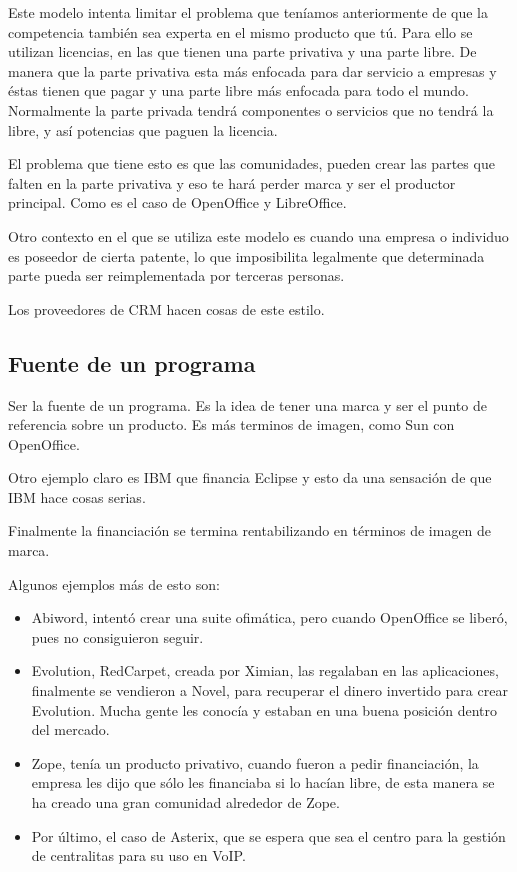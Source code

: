 Este modelo intenta limitar el problema que teníamos anteriormente de que la
competencia también sea experta en el mismo producto que tú. Para ello se
utilizan licencias, en las que tienen una parte privativa y una parte libre. De
manera que la parte privativa esta más enfocada para dar servicio a empresas y
éstas tienen que pagar y una parte libre más enfocada para todo el mundo.
Normalmente la parte privada tendrá componentes o servicios que no tendrá la
libre, y así potencias que paguen la licencia.

El problema que tiene esto es que las comunidades, pueden crear las partes
que falten en la parte privativa y eso te hará perder marca y ser el productor
principal. Como es el caso de OpenOffice y LibreOffice.

Otro contexto en el que se utiliza este modelo es cuando una empresa o
individuo es poseedor de cierta patente, lo que imposibilita
legalmente que determinada parte pueda ser reimplementada por terceras
personas.

Los proveedores de CRM hacen cosas de este estilo.


\subsection{Fuente de un programa}

Ser la fuente de un programa. Es la idea de tener una marca y ser el punto de
referencia sobre un producto. Es más terminos de imagen, como Sun con OpenOffice.

Otro ejemplo claro es IBM que financia Eclipse y esto da una sensación de que
IBM hace cosas serias.

Finalmente la financiación se termina rentabilizando en términos de imagen de
marca.

Algunos ejemplos más de esto son:
\begin{itemize}
 \item Abiword, intentó crear una suite ofimática, pero cuando OpenOffice se liberó,
pues no consiguieron seguir.
\item Evolution, RedCarpet, creada por Ximian, las regalaban en las
aplicaciones, finalmente se vendieron a Novel, para recuperar el dinero
invertido para crear Evolution. Mucha gente les conocía y estaban en una buena
posición dentro del mercado.
\item Zope, tenía un producto privativo, cuando fueron a pedir financiación, la
empresa les dijo que sólo les financiaba si lo hacían libre, de esta manera se
ha creado una gran comunidad alrededor de Zope.
\item Por último, el caso de Asterix, que se espera que sea el centro para la
gestión de centralitas para su uso en VoIP.
\end{itemize}



